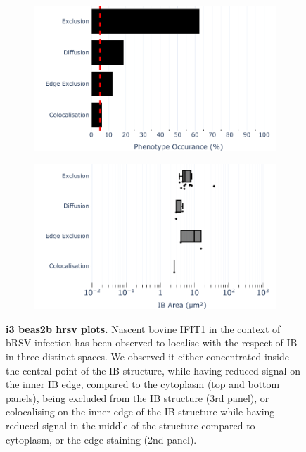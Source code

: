 \begin{figure}
    \begin{subfigure}{0.495\textwidth}
        \caption{}
        \includegraphics[width=1\linewidth]{09. Chapter 4/Figs/02. Infection/02. IFIT3/04. bar_i3_beas2b.pdf} 
    \end{subfigure}
    \begin{subfigure}{0.495\textwidth}
        \caption{}        
        \includegraphics[width=1\linewidth]{09. Chapter 4/Figs/02. Infection/02. IFIT3/05. box_i3_beas2b.pdf}
    \end{subfigure}
    \caption[i3 beas2b hrsv plots]{\textbf{i3 beas2b hrsv plots.} Nascent bovine IFIT1 in the context of bRSV infection has been observed to localise with the respect of IB in three distinct spaces. We observed it either concentrated inside the central point of the IB structure, while having reduced signal on the inner IB edge, compared to the cytoplasm (top and bottom panels), being excluded from the IB structure (3rd panel), or colocalising on the inner edge of the IB structure while having reduced signal in the middle of the structure compared to cytoplasm, or the edge staining (2nd panel).}
    \label{fig:i3 beas2b hrsv plots}
\end{figure}

